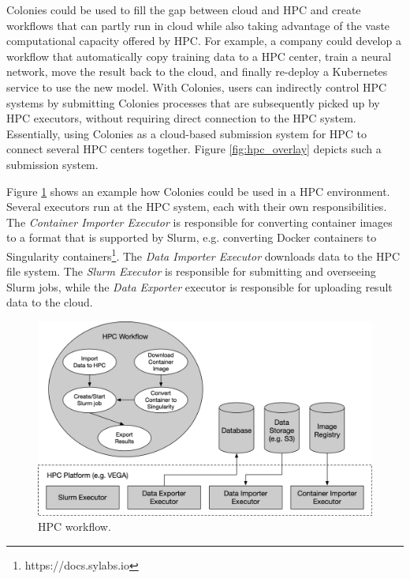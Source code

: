\documentclass{article}
\begin{document}
Colonies could be used to fill the gap between cloud and HPC and create workflows that can partly run in cloud while also taking advantage of the vaste computational capacity offered by HPC. For example, a company could develop a workflow that automatically copy training data to a HPC center, train a neural network, move the result back to the cloud, and finally re-deploy a Kubernetes service to use the new model. With Colonies, users can indirectly control HPC systems by submitting Colonies processes that are subsequently picked up by HPC executors, without requiring direct connection to the HPC system. Essentially, using Colonies as a cloud-based submission system for HPC to connect several HPC centers together. Figure \ref{fig:hpc_overlay} depicts such a submission system.

Figure \ref{fig:hpc_workflow} shows an example how Colonies could be used in a HPC environment. Several executors run at the HPC system, each with their own responsibilities. The \emph{Container Importer Executor} is responsible for converting container images to a format that is supported by Slurm, e.g. converting Docker containers to Singularity containers\footnote{https://docs.sylabs.io}. The \emph{Data Importer Executor} downloads data to the HPC file system. The \emph{Slurm Executor} is responsible for submitting and overseeing Slurm jobs, while the \emph{Data Exporter} executor is responsible for uploading result data to the cloud.

\begin{figure}[h]
	\centering
    \includegraphics[scale=0.43]{hpc_workflow.png}
	\caption{HPC workflow.}
	\label{fig:hpc_workflow}
\end{figure}
\end{document}
